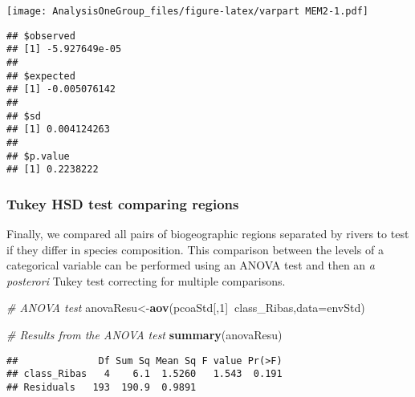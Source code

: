 \documentclass[]{article}
\newenvironment{Shaded}{\begin{snugshade}}{\end{snugshade}}
\newcommand{\CommentTok}[1]{\textcolor[rgb]{0.56,0.35,0.01}{\textit{#1}}}
\newcommand{\DataTypeTok}[1]{\textcolor[rgb]{0.13,0.29,0.53}{#1}}
\newcommand{\DecValTok}[1]{\textcolor[rgb]{0.00,0.00,0.81}{#1}}
\newcommand{\KeywordTok}[1]{\textcolor[rgb]{0.13,0.29,0.53}{\textbf{#1}}}
\newcommand{\NormalTok}[1]{#1}
\newcommand{\OperatorTok}[1]{\textcolor[rgb]{0.81,0.36,0.00}{\textbf{#1}}}
\begin{document}
\texttt{[image: AnalysisOneGroup\_files/figure-latex/varpart MEM2-1.pdf]}

\begin{Shaded}
\end{Shaded}

\begin{verbatim}
## $observed
## [1] -5.927649e-05
## 
## $expected
## [1] -0.005076142
## 
## $sd
## [1] 0.004124263
## 
## $p.value
## [1] 0.2238222
\end{verbatim}

\hypertarget{tukey-hsd-test-comparing-regions}{%
\subsubsection{Tukey HSD test comparing
regions}\label{tukey-hsd-test-comparing-regions}}

Finally, we compared all pairs of biogeographic regions separated by
rivers to test if they differ in species composition. This comparison
between the levels of a categorical variable can be performed using an
ANOVA test and then an \emph{a posterori} Tukey test correcting for
multiple comparisons.

\begin{Shaded}
\begin{Highlighting}[]
\CommentTok{# ANOVA test}
\NormalTok{anovaResu<-}\KeywordTok{aov}\NormalTok{(pcoaStd[,}\DecValTok{1}\NormalTok{]}\OperatorTok{~}\NormalTok{class_Ribas,}\DataTypeTok{data=}\NormalTok{envStd)}

\CommentTok{# Results from the ANOVA test}
\KeywordTok{summary}\NormalTok{(anovaResu)}
\end{Highlighting}
\end{Shaded}

\begin{verbatim}
##              Df Sum Sq Mean Sq F value Pr(>F)
## class_Ribas   4    6.1  1.5260   1.543  0.191
## Residuals   193  190.9  0.9891
\end{verbatim}
\end{document}
